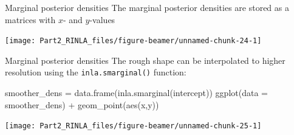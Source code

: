 \documentclass[
  ignorenonframetext,
]{beamer}
\newenvironment{Shaded}{\begin{snugshade}}{\end{snugshade}}
\newcommand{\AttributeTok}[1]{\textcolor[rgb]{0.77,0.63,0.00}{#1}}
\newcommand{\FunctionTok}[1]{\textcolor[rgb]{0.00,0.00,0.00}{#1}}
\newcommand{\NormalTok}[1]{#1}
\newcommand{\OtherTok}[1]{\textcolor[rgb]{0.56,0.35,0.01}{#1}}
\newcommand{\SpecialCharTok}[1]{\textcolor[rgb]{0.00,0.00,0.00}{#1}}
\newcommand{\StringTok}[1]{\textcolor[rgb]{0.31,0.60,0.02}{#1}}
\begin{document}
\begin{frame}[fragile]{Marginal posterior densities}
\protect\hypertarget{marginal-posterior-densities}{}
The marginal posterior densities are stored as a matrices with \(x\)-
and \(y\)-values \small

\begin{Shaded}
\end{Shaded}

\begin{center}\texttt{[image: Part2\_RINLA\_files/figure-beamer/unnamed-chunk-24-1]} \end{center}
\normalsize
\end{frame}

\begin{frame}[fragile]{Marginal posterior densities}
\protect\hypertarget{marginal-posterior-densities-1}{}
The rough shape can be interpolated to higher resolution using the
\texttt{inla.smarginal()} function:

\begin{Shaded}
\begin{Highlighting}[]
\NormalTok{smoother\_dens }\OtherTok{=} \FunctionTok{data.frame}\NormalTok{(}\FunctionTok{inla.smarginal}\NormalTok{(intercept))}
\FunctionTok{ggplot}\NormalTok{(}\AttributeTok{data =}\NormalTok{ smoother\_dens) }\SpecialCharTok{+} \FunctionTok{geom\_point}\NormalTok{(}\FunctionTok{aes}\NormalTok{(x,y))}
\end{Highlighting}
\end{Shaded}

\begin{center}\texttt{[image: Part2\_RINLA\_files/figure-beamer/unnamed-chunk-25-1]} \end{center}
\end{frame}
\end{document}
